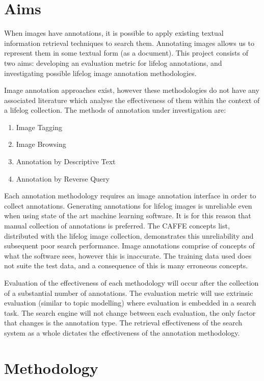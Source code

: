 \documentclass[12pt,a4paper]{article}
\begin{document}
\section{Aims}
When images have annotations, it is possible to apply existing textual information retrieval techniques to search them. Annotating images allows us to represent them in some textual form (as a document). This project consists of two aims: developing an evaluation metric for lifelog annotations, and investigating possible lifelog image annotation methodologies.

Image annotation approaches exist, however these methodologies do not have any associated literature which analyse the effectiveness of them within the context of a lifelog collection. The methods of annotation under investigation are:
\begin{enumerate}
    \item Image Tagging
    \item Image Browsing
    \item Annotation by Descriptive Text
    \item Annotation by Reverse Query
\end{enumerate}
Each annotation methodology requires an image annotation interface in order to collect annotations. Generating annotations for lifelog images is unreliable even when using state of the art machine learning software. It is for this reason that manual collection of annotations is preferred. The CAFFE concepts list, distributed with the lifelog image collection, demonstrates this unreliability and subsequent poor search performance. Image annotations comprise of concepts of what the software sees, however this is inaccurate. The training data used does not suite the test data, and a consequence of this is many erroneous concepts.

Evaluation of the effectiveness of each methodology will occur after the collection of a substantial number of annotations. The evaluation metric will use extrinsic evaluation (similar to topic modelling) where evaluation is embedded in a search task.  The search engine will not change between each evaluation, the only factor that changes is the annotation type. The retrieval effectiveness of the search system as a whole dictates the effectiveness of the annotation methodology. 

\section{Methodology}
\end{document}
